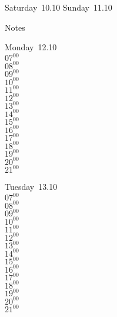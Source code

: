 \documentclass[11pt,a4paper]{book}\usepackage[]{graphicx}\usepackage[]{color}
\begin{document}
\begin{weekendbox}
  Saturday~10.10
  \tcblower
  Sunday~11.10
\end{weekendbox} %
\begin{notebox}
  Notes
\end{notebox}
\clearpage
\begin{headerbox}
\end{headerbox}
\begin{weekdaybox}
  Monday~12.10\\
  { 
  \vfill
  $07^{00}$\\
$08^{00}$\\
$09^{00}$\\
$10^{00}$\\
$11^{00}$\\
$12^{00}$\\
$13^{00}$\\
$14^{00}$\\
$15^{00}$\\
$16^{00}$\\
$17^{00}$\\
$18^{00}$\\
$19^{00}$\\
$20^{00}$\\
$21^{00}$\\
  }
\end{weekdaybox}
\begin{weekdaybox}
  Tuesday~13.10\\
  { 
  \vfill
  $07^{00}$\\
$08^{00}$\\
$09^{00}$\\
$10^{00}$\\
$11^{00}$\\
$12^{00}$\\
$13^{00}$\\
$14^{00}$\\
$15^{00}$\\
$16^{00}$\\
$17^{00}$\\
$18^{00}$\\
$19^{00}$\\
$20^{00}$\\
$21^{00}$\\
  }
\end{weekdaybox}
\end{document}
